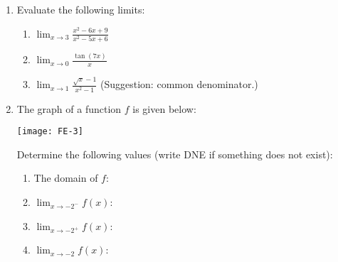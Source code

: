 \documentclass[12pt]{article}
\newcommand{\points}[1]{\marginpar{\hspace{24pt}[#1]}}
\newcommand{\di}{\displaystyle}
\begin{document}
 \begin{enumerate}
 \item  Evaluate the following limits:
\begin{enumerate}
 \item $\di \lim_{x\to 3} \frac{x^2-6x+9}{x^2-5x+6}$ \points{3}

\vspace{2in}

 \item $\di \lim_{x\to 0}\frac{\tan(7x)}{x}$ \points{3}

\vspace{2in}

 \item $\di \lim_{x\to 1}\frac{\sqrt{x}-1}{x^2-1}$ \points{3} (Suggestion: common denominator.)

\end{enumerate}
\newpage

\item The graph of a function $f$ is given below: \points{9}

\begin{center}
 \texttt{[image: FE-3]}
\end{center}


Determine the following values (write DNE if something does not exist):
\begin{multicols}{2}
\begin{enumerate}
 \item The domain of $f$: \underline{\hspace{1in}}
 
 \bigskip
 
 
 \bigskip
 
 \item $\di\lim_{x \to -2^-}f(x)$: \underline{\hspace{1in}}
 
 \bigskip

 \bigskip
 
 \item $\di \lim_{x\to -2^+}f(x)$: \underline{\hspace{1in}}  
 
 \bigskip
 
 \bigskip
 
 \item $\di \lim_{x\to -2}f(x)$: \underline{\hspace{1in}}
 
 \bigskip
 
 \bigskip
 

\end{enumerate}
\end{multicols}
\end{enumerate}
\end{document}
